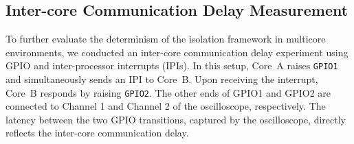 \documentclass[letterpaper]{article}
\begin{document}
\begin{table}[t]
\centering
{}
\caption{Latency comparison under different configurations.}
\label{tab:latency-comparison}
\end{table}


\begin{table}[t]
\centering
{}
\caption{Latency comparison under different configurations (Timestamp counter based).}
\label{tab:latency-comparison1}
\end{table}


\subsection{Inter-core Communication Delay Measurement}

To further evaluate the determinism of the isolation framework in multicore environments, we
conducted an inter-core communication delay experiment using GPIO and inter-processor interrupts (IPIs).
In this setup, Core~A raises \texttt{GPIO1} and simultaneously sends an IPI to Core~B. Upon receiving
the interrupt, Core~B responds by raising \texttt{GPIO2}.
The other ends of GPIO1 and GPIO2 are connected to Channel 1 and Channel 2 of the oscilloscope, respectively.
The latency between the two GPIO transitions,
captured by the oscilloscope, directly reflects the inter-core communication delay.


\begin{table}[t]
\centering
{}
\caption{Latency comparison under different configurations (Inter-core communication delay).}
\label{tab:latency-comparison3}
\end{table}
\end{document}
